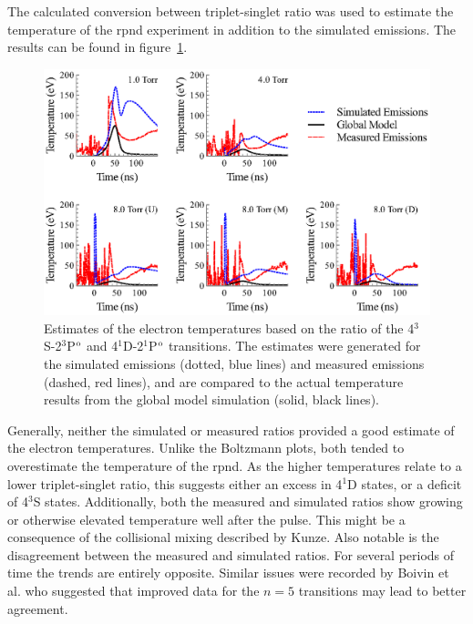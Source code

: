 The calculated conversion between triplet-singlet ratio was used to estimate the
temperature of the \acs{rpnd} experiment in addition to the simulated emissions.
The results can be found in figure~\ref{fig:rat2comp}.
\begin{figure}
  \centering
  \includegraphics{./chapters/emissions/figures/rat2comp.eps}
  \caption{Estimates of the electron temperatures based on the ratio of the
    4$^3$S-2$^3$P$^\mathrm{o}$ and 4$^1$D-2$^1$P$^\mathrm{o}$ transitions. The estimates were
    generated for the simulated emissions (dotted, blue lines) and measured
    emissions (dashed, red lines), and are compared to the actual temperature
    results from the global model simulation (solid, black lines).}
  \label{fig:rat2comp}
\end{figure}
Generally, neither the simulated or measured ratios provided a good estimate of
the electron temperatures. Unlike the Boltzmann plots, both tended to
overestimate the temperature of the \acs{rpnd}. As the higher temperatures
relate to a lower triplet-singlet ratio, this suggests either an excess in
4$^1$D states, or a deficit of 4$^3$S states. Additionally, both the measured
and simulated ratios show growing or otherwise elevated temperature well after
the pulse. This might be a consequence of the collisional mixing described by
Kunze. Also notable is the disagreement between the measured and simulated
ratios. For several periods of time the trends are entirely opposite. Similar
issues were recorded by Boivin et al. \cite{Boivin2007} who suggested that
improved data for the $n=5$ transitions may lead to better agreement.

